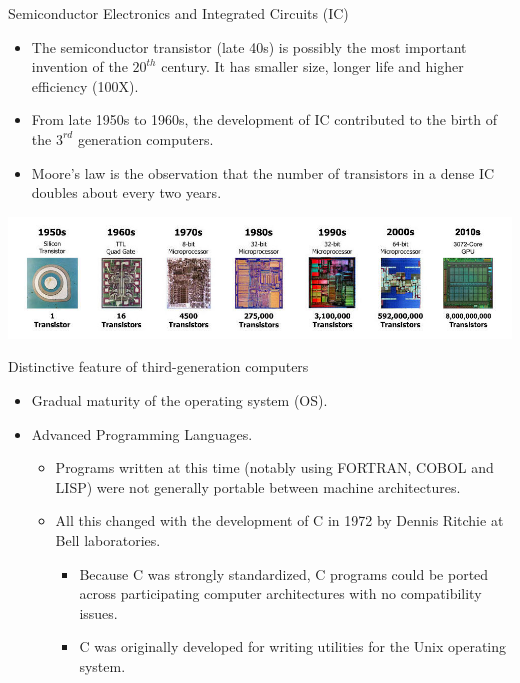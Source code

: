 \documentclass[11pt]{beamer}
\let\OldTexttt\texttt
\renewcommand{\texttt}[1]{\OldTexttt{\color{teal}{#1}}}
\begin{document}
\begin{frame}{Semiconductor Electronics and Integrated Circuits (IC)}
\begin{itemize}
    \item The semiconductor transistor (late 40s) is possibly the most important invention of the $20^{th}$ century. It has smaller size, longer life and higher efficiency (100X).
    \item From late 1950s to 1960s, the development of IC contributed to the birth of the $3^{rd}$ generation computers.
    \item Moore's law is the observation that the number of transistors in a dense IC doubles about every two years.
\end{itemize}
\center
\includegraphics[scale=0.3]{microchip.jpg}
\end{frame}

\begin{frame}{Distinctive feature of third-generation computers}
\begin{itemize}
    \item Gradual maturity of the operating system (OS).
    \item Advanced Programming Languages.
    \begin{itemize}
        \item Programs written at this time (notably using FORTRAN, COBOL and LISP) were not generally portable between machine architectures. \texttt{Incompatible due to a lack of standardization!}
        
        \item All this changed with the development of C in 1972 by Dennis Ritchie at Bell laboratories.
        \begin{itemize}
            \item Because C was strongly standardized, C programs could be ported across participating computer architectures with no compatibility issues.
            \item C was originally developed for writing utilities for the Unix operating system.
        \end{itemize}
    \end{itemize}
\end{itemize}

\end{frame}
\end{document}
